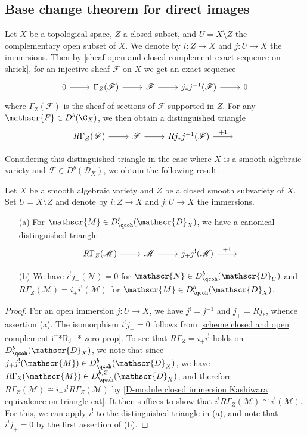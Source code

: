 \subsection{Base change theorem for direct images}
Let $X$ be a topological space, $Z$ a closed subset, and $U=X\setminus Z$ the complementary open subset of $X$. We denote by $i:Z\to X$ and $j:U\to X$ the immersions. Then by \cref{sheaf open and closed complement exact sequence on shriek}, for an injective sheaf $\mathscr{F}$ on $X$ we get an exact sequence
\[\begin{tikzcd}
0\ar[r]&\Gamma_Z(\mathscr{F})\ar[r]&\mathscr{F}\ar[r]&j_*j^{-1}(\mathscr{F})\ar[r]&0
\end{tikzcd}\]
where $\Gamma_Z(\mathscr{F})$ is the sheaf of sections of $\mathscr{F}$ supported in $Z$. For any $\mathscr{F}\in D^b(\C_X)$, we then obtain a distinguished triangle
\[\begin{tikzcd}
R\Gamma_Z(\mathscr{F})\ar[r]&\mathscr{F}\ar[r]&Rj_*j^{-1}(\mathscr{F})\ar[r,"+1"]&{}
\end{tikzcd}\]

Considering this distinguished triangle in the case where $X$ is a smooth algebraic variety and $\mathscr{F}\in D^b(\mathscr{D}_X)$, we obtain the following result.
\begin{proposition}\label{D-module open and closed complement dt of shriek}
Let $X$ be a smooth algebraic variety and $Z$ be a closed smooth subvariety of $X$. Set $U=X\setminus Z$ and denote by $i:Z\to X$ and $j:U\to X$ the immersions.
\begin{enumerate}
    \item[(a)] For $\mathscr{M}\in D_{\qcoh}^b(\mathscr{D}_X)$, we have a canonical distinguished triangle
    \[\begin{tikzcd}
    R\Gamma_Z(\mathscr{M})\ar[r]&\mathscr{M}\ar[r]&j_+j^!(\mathscr{M})\ar[r,"+1"]&{}
    \end{tikzcd}\]
    \item[(b)] We have $i^!j_+(\mathscr{N})=0$ for $\mathscr{N}\in D^b_{\qcoh}(\mathscr{D}_U)$ and $R\Gamma_Z(\mathscr{M})=i_+i^!(\mathscr{M})$ for $\mathscr{M}\in D^b_{\qcoh}(\mathscr{D}_X)$.
\end{enumerate}
\end{proposition}
\begin{proof}
For an open immersion $j:U\to X$, we have $j^!=j^{-1}$ and $j_+=Rj_*$, whence assertion (a). The isomorphism $i^!j_+=0$ follows from \cref{scheme closed and open complement i^*Rj_* zero prop}. To see that $R\Gamma_Z=i_+i^!$ holds on $D^b_{\qcoh}(\mathscr{D}_X)$, we note that since $j_+j^!(\mathscr{M})\in D^b_{\qcoh}(\mathscr{D}_X)$, we have $R\Gamma_Z(\mathscr{M})\in D_{\qcoh}^{b,Z}(\mathscr{D}_X)$, and therefore $R\Gamma_Z(\mathscr{M})\cong i_+i^!R\Gamma_Z(\mathscr{M})$ by \cref{D-module closed immersion Kashiwara equivalence on triangle cat}. It then suffices to show that $i^!R\Gamma_Z(\mathscr{M})\cong i^!(\mathscr{M})$. For this, we can apply $i^!$ to the distinguished triangle in (a), and note that $i^!j_+=0$ by the first assertion of (b).
\end{proof}

